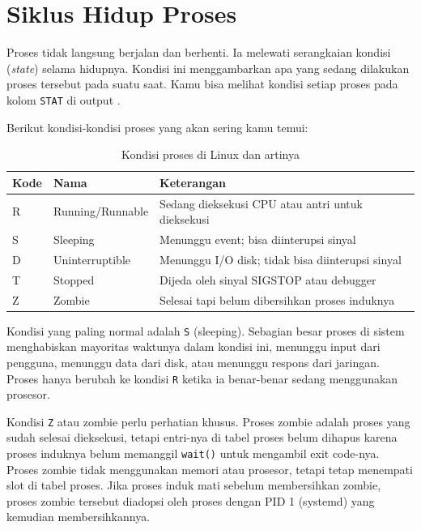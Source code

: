 \section{Siklus Hidup Proses}
\label{sec:process-lifecycle}

Proses tidak langsung berjalan dan berhenti. Ia melewati serangkaian kondisi (\textit{state})
selama hidupnya. Kondisi ini menggambarkan apa yang sedang dilakukan proses tersebut pada
suatu saat. Kamu bisa melihat kondisi setiap proses pada kolom \texttt{STAT} di output
.

Berikut kondisi-kondisi proses yang akan sering kamu temui:

\begin{table}[htbp]
    \centering
    \caption{Kondisi proses di Linux dan artinya}
    \begin{tabular}{lll}
        \hline
        \textbf{Kode} & \textbf{Nama} & \textbf{Keterangan} \\
        \hline
        R & Running/Runnable  & Sedang dieksekusi CPU atau antri untuk dieksekusi \\
        S & Sleeping          & Menunggu event; bisa diinterupsi sinyal \\
        D & Uninterruptible   & Menunggu I/O disk; tidak bisa diinterupsi sinyal \\
        T & Stopped           & Dijeda oleh sinyal SIGSTOP atau debugger \\
        Z & Zombie            & Selesai tapi belum dibersihkan proses induknya \\
        \hline
    \end{tabular}
\end{table}

Kondisi yang paling normal adalah \texttt{S} (sleeping). Sebagian besar proses di sistem
menghabiskan mayoritas waktunya dalam kondisi ini, menunggu input dari pengguna, menunggu
data dari disk, atau menunggu respons dari jaringan. Proses hanya berubah ke kondisi
\texttt{R} ketika ia benar-benar sedang menggunakan prosesor.

Kondisi \texttt{Z} atau zombie perlu perhatian khusus. Proses zombie adalah proses yang
sudah selesai dieksekusi, tetapi entri-nya di tabel proses belum dihapus karena proses
induknya belum memanggil \texttt{wait()} untuk mengambil exit code-nya. Proses zombie
tidak menggunakan memori atau prosesor, tetapi tetap menempati slot di tabel proses.
Jika proses induk mati sebelum membersihkan zombie, proses zombie tersebut diadopsi oleh
proses dengan PID 1 (systemd) yang kemudian membersihkannya.

